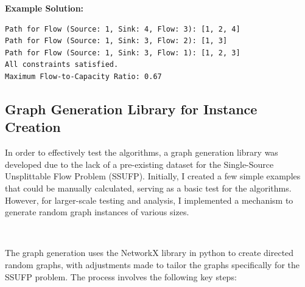 \documentclass[a4paper,12pt]{article}
\begin{document}
\noindent \textbf{Example Solution:}
\begin{verbatim}
Path for Flow (Source: 1, Sink: 4, Flow: 3): [1, 2, 4]
Path for Flow (Source: 1, Sink: 3, Flow: 2): [1, 3]
Path for Flow (Source: 1, Sink: 3, Flow: 1): [1, 2, 3]
All constraints satisfied.
Maximum Flow-to-Capacity Ratio: 0.67
\end{verbatim}

\subsection{Graph Generation Library for Instance Creation}

In order to effectively test the algorithms, a graph generation library was developed due to the lack of a pre-existing dataset for the Single-Source Unsplittable Flow Problem (SSUFP). Initially, I created a few simple examples that could be manually calculated, serving as a basic test for the algorithms. However, for larger-scale testing and analysis, I implemented a mechanism to generate random graph instances of various sizes.

\

\noindent The graph generation uses the NetworkX library in python to create directed random graphs, with adjustments made to tailor the graphs specifically for the SSUFP problem. The process involves the following key steps:
\end{document}
